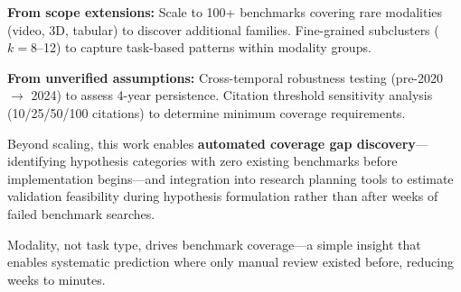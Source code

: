 \textbf{From scope extensions:} Scale to 100+ benchmarks covering rare modalities (video, 3D, tabular) to discover additional families. Fine-grained subclusters ($k=8$--12) to capture task-based patterns within modality groups.

\textbf{From unverified assumptions:} Cross-temporal robustness testing (pre-2020 $\rightarrow$ 2024) to assess 4-year persistence. Citation threshold sensitivity analysis (10/25/50/100 citations) to determine minimum coverage requirements.

Beyond scaling, this work enables \textbf{automated coverage gap discovery}---identifying hypothesis categories with zero existing benchmarks before implementation begins---and integration into research planning tools to estimate validation feasibility during hypothesis formulation rather than after weeks of failed benchmark searches.

Modality, not task type, drives benchmark coverage---a simple insight that enables systematic prediction where only manual review existed before, reducing weeks to minutes.
